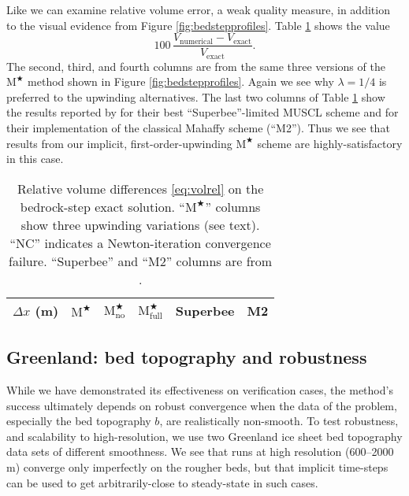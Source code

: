 \documentclass[twocolumn,a4paper]{igs}
\newcommand{\Mstar}{$\text{M}^{\bigstar}$\xspace}
\newcommand{\Mstarnoup}{$\text{M}^{\bigstar}_{\text{no}}$\xspace}
\newcommand{\Mstarfullup}{$\text{M}^{\bigstar}_{\text{full}}$\xspace}
\begin{document}
Like \cite{JaroschSchoofAnslow2013} we can examine relative volume error, a weak quality measure, in addition to the visual evidence from Figure \ref{fig:bedstepprofiles}.  Table \ref{tab:bedstepvol} shows the value
\begin{equation}
100\, \frac{V_{\text{numerical}} - V_{\text{exact}}}{V_{\text{exact}}}. \label{eq:volrel}
\end{equation}
The second, third, and fourth columns are from the same three versions of the \Mstar method shown in Figure \ref{fig:bedstepprofiles}.  Again we see why $\lambda=1/4$ is preferred to the upwinding alternatives.  The last two columns of Table \ref{tab:bedstepvol} show the results reported by \cite{JaroschSchoofAnslow2013} for their best ``Superbee''-limited MUSCL scheme and for their implementation of the classical Mahaffy scheme (``M2'').  Thus we see that results from our implicit, first-order-upwinding \Mstar scheme are highly-satisfactory in this case.

\begin{table}[ht]
  \caption{Relative volume differences \eqref{eq:volrel} on the bedrock-step exact solution.  ``\Mstar'' columns show three upwinding variations (see text).  ``NC'' indicates a Newton-iteration convergence failure.  ``Superbee'' and ``M2'' columns are from \cite{JaroschSchoofAnslow2013}.}
  \vskip4mm \centering
  \begin{tabular}{lccccc}
    $\Delta x$ (m) & \Mstar & \Mstarnoup & \Mstarfullup & Superbee & M2 \\  \hline

  \end{tabular}
  \label{tab:bedstepvol}
\end{table}


\subsection{Greenland: bed topography and robustness}

While we have demonstrated its effectiveness on verification cases, the method's success ultimately depends on robust convergence when the data of the problem, especially the bed topography $b$, are realistically non-smooth.  To test robustness, and scalability to high-resolution, we use two Greenland ice sheet bed topography data sets of different smoothness.  We see that runs at high resolution (600--2000 m) converge only imperfectly on the rougher beds, but that implicit time-steps can be used to get arbitrarily-close to steady-state in such cases.
\end{document}
